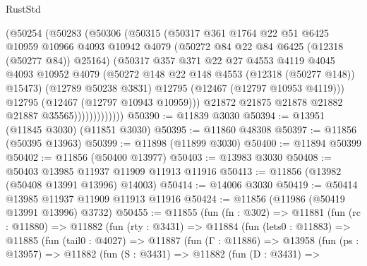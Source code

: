 \begin{lexlean}{RustStd}
\begin{coremodule}
                      (@50254
                        (@50283
                          (@50306
                            (@50315
                              (@50317
                                @361
                                @1764
                                @22
                                @51
                                @6425
                                @10959
                                @10966
                                @4093
                                @10942
                                @4079
                                (@50272 @84 @22 @84 @6425 (@12318 (@50277 @84)) @25164)
                                (@50317
                                  @357
                                  @371
                                  @22
                                  @27
                                  @4553
                                  @4119
                                  @4045
                                  @4093
                                  @10952
                                  @4079
                                  (@50272 @148 @22 @148 @4553 (@12318 (@50277 @148)) @15473)
                                  (@12789 @50238 @3831)
                                  @12795
                                  (@12467 (@12797 @10953 @4119)))
                                @12795
                                (@12467 (@12797 @10943 @10959)))
                              @21872
                              @21875
                              @21878
                              @21882
                              @21887
                              @35565)))))))))))))
@50390 := @11839 @3030
@50394 := @13951 (@11845 @3030) (@11851 @3030)
@50395 := @11860 @48308
@50397 := @11856 (@50395 @13963)
@50399 := @11898 (@11899 @3030)
@50400 := @11894 @50399
@50402 := @11856 (@50400 @13977)
@50403 := @13983 @3030
@50408 := @50403 @13985 @11937 @11909 @11913 @11916
@50413 := @11856 (@13982 (@50408 @13991 @13996) @14003)
@50414 := @14006 @3030
@50419 := @50414 @13985 @11937 @11909 @11913 @11916
@50424 := @11856 (@11986 (@50419 @13991 @13996) @3732)
@50455 := @11855
    (fun (fn : @302) =>
    @11881
      (fun (rc : @11880) =>
      @11882
        (fun (rty : @3431) =>
        @11884
          (fun (lets0 : @11883) =>
          @11885
            (fun (tail0 : @4027) =>
            @11887
              (fun (Γ : @11886) =>
              @13958
                (fun (ps : @13957) =>
                @11882
                  (fun (S : @3431) =>
                  @11882
                    (fun (D : @3431) =>

\end{coremodule}
\end{lexlean}
